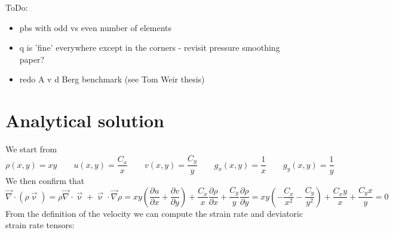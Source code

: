 
ToDo:
\begin{itemize}
\item pbs with odd vs even number of elements 
\item q is 'fine' everywhere except in the corners - revisit pressure smoothing paper?
\item redo A v d Berg benchmark (see Tom Weir thesis)
\end{itemize}



\newpage
\section*{Analytical solution}


We start from 
\[
\rho(x,y)=xy
\qquad
u(x,y)=\frac{C_x}{x}
\qquad
v(x,y)=\frac{C_y}{y}
\qquad
g_x(x,y)=\frac{1}{x}
\qquad
g_y(x,y)=\frac{1}{y}
\]
We then confirm that 
\[
\vec\nabla \cdot (\rho \vec\upnu) 
= \rho \vec\nabla \cdot \vec\upnu
+ \vec\upnu \cdot \vec\nabla \rho
= xy \left(\frac{\partial u}{\partial x}+\frac{\partial v}{\partial y} \right)
+ \frac{C_x}{x} \frac{\partial \rho}{\partial x}
+ \frac{C_y}{y} \frac{\partial \rho}{\partial y}
= xy \left( -\frac{C_x}{x^2} - \frac{C_y}{y^2}  \right)
+ \frac{C_x y}{x} + \frac{C_y x}{y}=0
\]
From the definition of the velocity we can compute the strain rate and deviatoric strain rate tensors:

